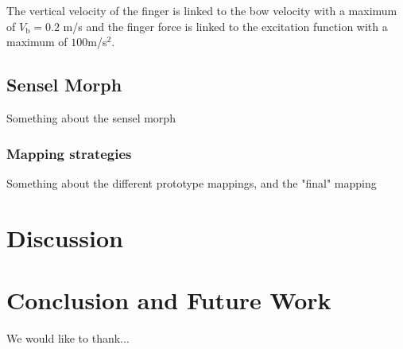 \documentclass{article}
\begin{document}
The vertical velocity of the finger is linked to the bow velocity with a maximum of $V_\text{b} = 0.2$ m/s and the finger force is linked to the excitation function with a maximum of $100$m/s$^2$.

\subsection{Sensel Morph}
Something about the sensel morph
\subsubsection{Mapping strategies}
Something about the different prototype mappings, and the "final" mapping 

\section{Discussion}


\section{Conclusion and Future Work}



\begin{acknowledgments}
We would like to thank...
\end{acknowledgments} 


\end{document}
